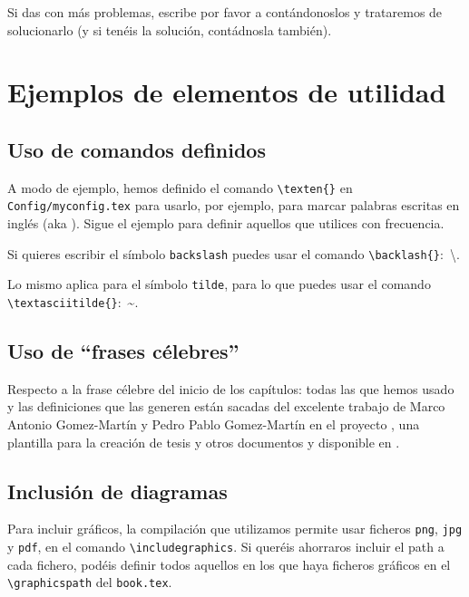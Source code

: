Si das con más problemas, escribe por favor a \contactauthor{} contándonoslos y trataremos de solucionarlo (y si tenéis la solución, contádnosla también).


\section{Ejemplos de elementos de utilidad}
\label{sec:ejempl-de-elem}

\subsection{Uso de comandos definidos}
\label{sec:uso-de-comandos}

A modo de ejemplo, hemos definido el comando \texttt{\textbackslash{}texten\{\}} en \texttt{Config/myconfig.tex} para usarlo, por ejemplo, para marcar palabras escritas en inglés (aka ). Sigue el ejemplo para definir aquellos que utilices con frecuencia.

Si quieres escribir el símbolo \texttt{backslash} puedes usar el comando \texttt{\textbackslash{}backlash\{\}}:~\textbackslash{}.

Lo mismo aplica para el símbolo \texttt{tilde}, para lo que puedes usar el comando \texttt{\textbackslash{}textasciitilde\{\}}:~\textasciitilde{}.


\subsection{Uso de ``frases célebres''}
\label{sec:uso-de-frases}

Respecto a la frase célebre del inicio de los capítulos: todas las que hemos usado y las definiciones que las generen están sacadas del excelente trabajo de Marco Antonio Gomez-Martín y Pedro Pablo Gomez-Martín en el proyecto \texis, una plantilla para la creación de tesis y otros documentos y disponible en \cite{texis}.


\subsection{Inclusión de diagramas}
\label{sec:diagrama}

Para incluir gráficos, la compilación que utilizamos permite usar ficheros \texttt{png}, \texttt{jpg} y \texttt{pdf}, en el comando \texttt{\textbackslash{}includegraphics}. Si queréis ahorraros incluir el path a cada fichero, podéis definir todos aquellos en los que haya ficheros gráficos en el \texttt{\textbackslash{}graphicspath} del \texttt{book.tex}.

